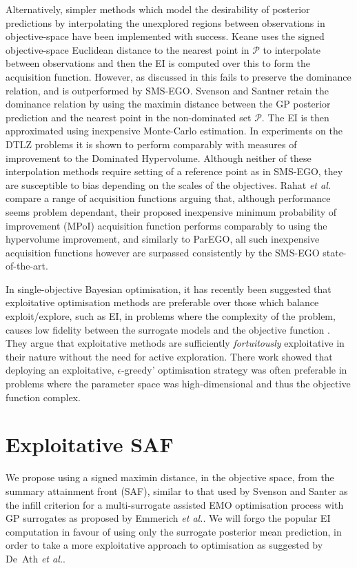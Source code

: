 \documentclass[conference]{IEEEtran}
\makeatletter
\newcommand\hpv{Dominated Hypervolume\xspace}
\newcommand\smsego{SMS-EGO\xspace}
\newcommand\ei{EI\xspace}
\newcommand\gp{GP\xspace}
\newcommand\maximin{maximin\xspace}
\newcommand*{\etal}{\textit{et al.}\@\xspace}
\makeatother
\begin{document}
Alternatively, simpler methods which model the desirability of posterior predictions by interpolating the unexplored regions between observations in objective-space have been implemented with success. Keane \cite{keane2006statistical} uses the signed objective-space Euclidean distance to the nearest point in $\mathcal{P}$ to interpolate between observations and then the \ei is computed over this to form the acquisition function. However, as discussed in \cite{wagner2010expected} this fails to preserve the dominance relation, and is outperformed by \smsego. Svenson and Santner  \cite{svenson2016multiobjective} retain the dominance relation by using the maximin distance between the \gp posterior prediction and the nearest point in the non-dominated set $\mathcal{P}$. The \ei is then approximated using inexpensive Monte-Carlo estimation. In experiments on the DTLZ problems \cite{deb2005scalable} it is shown to perform comparably with measures of improvement to the \hpv. Although neither of these interpolation methods require setting of a reference point as in \smsego, they are susceptible to bias depending on the scales of the objectives. Rahat \etal \cite{rahat2017alternative} compare a range of acquisition functions arguing that, although performance seems problem dependant, their proposed inexpensive minimum probability of improvement (MPoI) acquisition function performs comparably to using the hypervolume improvement, and similarly to ParEGO, all such inexpensive acquisition functions however are surpassed consistently by the \smsego state-of-the-art.

In single-objective Bayesian optimisation, it has recently been suggested that exploitative optimisation methods are preferable over those which balance exploit/explore, such as \ei, in problems where the complexity of the problem, causes low fidelity between the surrogate models and the objective function \cite{death2019greed}. They argue that exploitative methods are sufficiently \textit{fortuitously} exploitative in their nature without the need for active exploration. There work showed that deploying an exploitative, $\epsilon$-greedy' optimisation strategy was often preferable in problems where the parameter space was high-dimensional and thus the objective function complex.



\section{Exploitative SAF}\label{section:our_method}
We propose using a signed \maximin distance, in the objective space, from the summary attainment front (SAF), similar to that used by Svenson and Santer \cite{svenson2016multiobjective} as the infill criterion for a multi-surrogate assisted EMO optimisation process with \gp surrogates as proposed by Emmerich \etal \cite{emmerich2006single}. We will forgo the popular \ei computation in favour of using only the surrogate posterior mean prediction, in order to take a more exploitative approach to optimisation as suggested by De~Ath \etal \cite{death2019greed}. 
\end{document}

